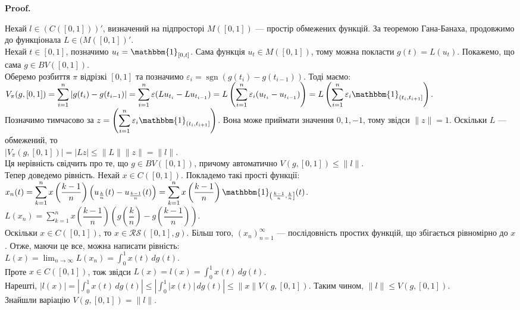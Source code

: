 \documentclass[a4paper, 10pt]{article}
\makeatletter
\theoremstyle{theoremdd}
\theoremstyle{theoremdd}
\theoremstyle{theoremdd}
\theoremstyle{theoremdd}
\theoremstyle{theoremdd}
\theoremstyle{theoremdd}
\theoremstyle{theoremdd}
\theoremstyle{theoremdd}
\renewenvironment{proof}[1][Proof.\\]{\par
\pushQED{\hfill \qed}%
\normalfont \topsep6\p@\@plus6\p@\relax
\trivlist
\item\relax
{\bfseries
#1\@addpunct{.}}\hspace\labelsep\ignorespaces
}{%
\popQED\endtrivlist\@endpefalse
}
\DeclareMathOperator{\sign}{sgn}
\makeatother
\begin{document}
\begin{proof}
Нехай $l \in (C([0,1]))'$, визначений на підпросторі $M([0,1])$ --- простір обмежених функцій. За теоремою Гана-Банаха, продовжимо до функціонала $L \in (M([0,1])'$.\\
Нехай $t \in [0,1]$, позначимо $u_t = \mathbbm{1}_{[0,t]}$. Сама функція $u_t \in M([0,1])$, тому можна покласти $g(t) = L(u_t)$. Покажемо, що сама $g \in BV([0,1])$.\\
Оберемо розбиття $\pi$ відрізкі $[0,1]$ та позначимо $\varepsilon_i = \sign(g(t_{i}) - g(t_{i-1}))$. Тоді маємо:\\
$V_\pi(g,[0,1]) = \displaystyle\sum_{i=1}^{n} |g(t_i) - g(t_{i-1})| = \sum_{i=1}^n \varepsilon (Lu_{t_{i}} - Lu_{t_{i-1}}) = L \left(\sum_{i=1}^n \varepsilon_i (u_{t_i} - u_{t_{i-1}})\right) = L \left( \sum_{i=1}^n \varepsilon_i \mathbbm{1}_{(t_i,t_{i+1}]} \right)$.\\
Позначимо тимчасово за $\displaystyle z = \left( \sum_{i=1}^n \varepsilon_i \mathbbm{1}_{(t_i,t_{i+1}]} \right)$. Вона може приймати значення $0,1,-1$, тому звідси $\|z\| = 1$. Оскільки $L$ --- обмежений, то\\
$|V_\pi(g,[0,1])| = |Lz| \leq \|L\| \|z\| = \|l\|$.\\
Ця нерівність свідчить про те, що $g \in BV([0,1])$, причому автоматично $V(g,[0,1]) \leq \|l\|$.
\bigskip \\
Тепер доведемо рівність. Нехай $x \in C([0,1])$. Покладемо такі прості функції:\\
$x_n(t) = \displaystyle\sum_{k=1}^n x\left(\dfrac{k-1}{n}\right) \left( u_{\frac{k}{n}}(t) - u_{\frac{k-1}{n}}(t) \right) = \sum_{k=1}^n x\left( \dfrac{k-1}{n} \right) \mathbbm{1}_{\left(\frac{k-1}{n},\frac{k}{n}\right]}(t)$.\\
$L(x_n) = \displaystyle\sum_{k=1}^n x\left(\dfrac{k-1}{n}\right) \left( g\left(\dfrac{k}{n}\right) - g\left(\dfrac{k-1}{n}\right) \right)$.\\
Оскільки $x \in C([0,1])$, то $x \in \mathcal{RS}([0,1],g)$. Більш того, $(x_n)_{n=1}^\infty$ --- послідовність простих функцій, що збігається рівномірно до $x$. Отже, маючи це все, можна написати рівність:\\
$L(x) = \displaystyle\lim_{n \to \infty} L(x_n) = \int_0^1 x(t)\,dg(t)$.\\
Проте $x \in C([0,1])$, тож звідси $L(x) = l(x) = \displaystyle\int_0^1 x(t)\,dg(t)$.\\
Нарешті, $|l(x)| = \displaystyle \left| \int_0^1 x(t)\,dg(t) \right| \leq \left| \int_0^1 |x(t)|\,dg(t) \right| \leq \|x\| V(g,[0,1])$. Таким чином, $\|l\| \leq V(g,[0,1])$.\\
Знайшли варіацію $V(g,[0,1]) = \|l\|$.
\end{proof}
\end{document}
